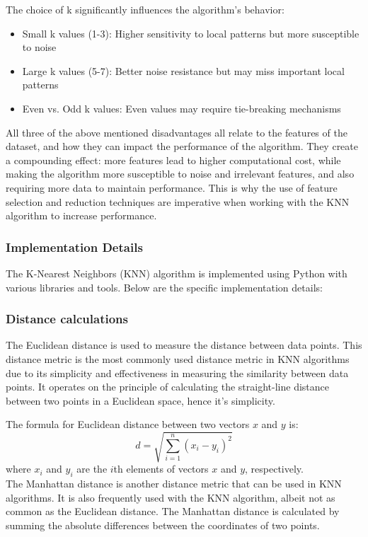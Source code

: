 The choice of k significantly influences the algorithm's behavior:
\begin{itemize}
    \item Small k values (1-3): Higher sensitivity to local patterns but more susceptible to noise
    \item Large k values (5-7): Better noise resistance but may miss important local patterns
    \item Even vs. Odd k values: Even values may require tie-breaking mechanisms
\end{itemize}

All three of the above mentioned disadvantages all relate to the features of the dataset, and how they can impact the performance of the algorithm.
They create a compounding effect: more features lead to higher computational cost, while making the algorithm more susceptible to noise and irrelevant features,
and also requiring more data to maintain performance. This is why the use of feature selection and reduction techniques are imperative 
when working with the KNN algorithm to increase performance.


\subsubsection{Implementation Details}
The K-Nearest Neighbors (KNN) algorithm is implemented using Python with various libraries and tools.
Below are the specific implementation details:

\subsubsection*{Distance calculations}
The Euclidean distance is used to measure the distance between data points. 
This distance metric is the most commonly used distance metric in KNN algorithms
due to its simplicity and effectiveness in measuring the similarity between data points\cite{IBM2023}.
It operates on the principle of calculating the straight-line distance between two points in a Euclidean space, hence it's simplicity.

The formula for Euclidean distance between two vectors \(x\) and \(y\) is:
\[ d = \sqrt{\sum_{i=1}^{n} (x_i - y_i)^2} \]
where \(x_i\) and \(y_i\) are the \(i\)th elements of vectors \(x\) and \(y\), respectively.\\

The Manhattan distance is another distance metric that can be used in KNN algorithms. It is also frequently used with the KNN algorithm,
albeit not as common as the Euclidean distance.
The Manhattan distance is calculated by summing the absolute differences between the coordinates of two points.

